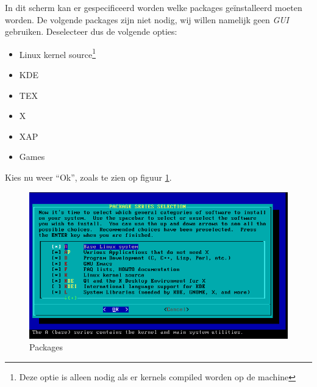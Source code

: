 In dit scherm kan er gespecificeerd worden welke packages ge\"{i}nstalleerd moeten worden. De volgende packages zijn niet nodig, wij willen namelijk geen \emph{GUI} gebruiken. Deselecteer dus de volgende opties: 
\begin{itemize}
  \item[1.] Linux kernel source\footnote{Deze optie is alleen nodig als er kernels compiled worden op de machine}
  \item[2.] KDE
  \item[3.] TEX
  \item[4.] X
  \item[5.] XAP
  \item[6.] Games
\end{itemize}
Kies nu weer ``Ok'', zoals te zien op figuur \ref{fig:packages}. 

\begin{figure}[H]
  \begin{center}
    \includegraphics[scale=0.5]{images/07_package_select}
  \end{center}
  \caption{Packages}
  \label{fig:packages}
\end{figure}

